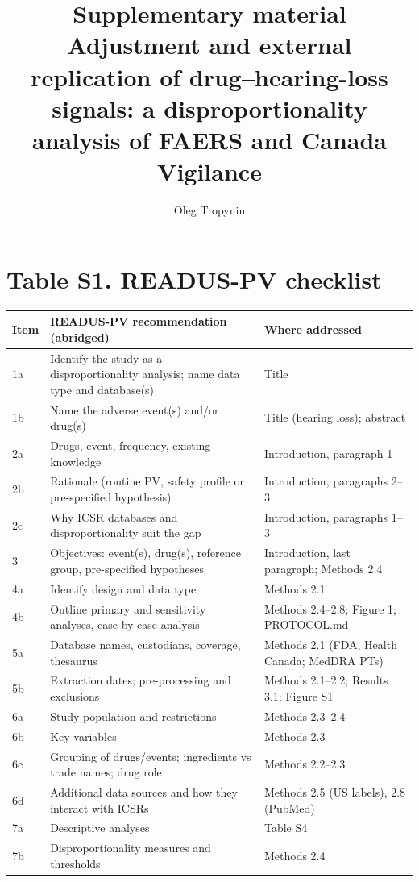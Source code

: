 \documentclass[10pt]{article}
\title{Supplementary material\\ \large Adjustment and external replication of drug--hearing-loss signals:
a disproportionality analysis of FAERS and Canada Vigilance}
\author{Oleg Tropynin}
\date{}
\begin{document}
\maketitle

\section*{Table S1. READUS-PV checklist}
{\footnotesize
\begin{longtable}{p{1cm}p{12cm}p{8cm}}
\toprule
Item & READUS-PV recommendation (abridged) & Where addressed \\
\midrule
1a & Identify the study as a disproportionality analysis; name data type and database(s) & Title \\
1b & Name the adverse event(s) and/or drug(s) & Title (hearing loss); abstract \\
2a & Drugs, event, frequency, existing knowledge & Introduction, paragraph 1 \\
2b & Rationale (routine PV, safety profile or pre-specified hypothesis) & Introduction, paragraphs 2--3 \\
2c & Why ICSR databases and disproportionality suit the gap & Introduction, paragraphs 1--3 \\
3 & Objectives: event(s), drug(s), reference group, pre-specified hypotheses & Introduction, last paragraph; Methods 2.4 \\
4a & Identify design and data type & Methods 2.1 \\
4b & Outline primary and sensitivity analyses, case-by-case analysis & Methods 2.4--2.8; Figure 1; PROTOCOL.md \\
5a & Database names, custodians, coverage, thesaurus & Methods 2.1 (FDA, Health Canada; MedDRA PTs) \\
5b & Extraction dates; pre-processing and exclusions & Methods 2.1--2.2; Results 3.1; Figure S1 \\
6a & Study population and restrictions & Methods 2.3--2.4 \\
6b & Key variables & Methods 2.3 \\
6c & Grouping of drugs/events; ingredients vs trade names; drug role & Methods 2.2--2.3 \\
6d & Additional data sources and how they interact with ICSRs & Methods 2.5 (US labels), 2.8 (PubMed) \\
7a & Descriptive analyses & Table S4 \\
7b & Disproportionality measures and thresholds & Methods 2.4 \\

\end{longtable}}
\end{document}
